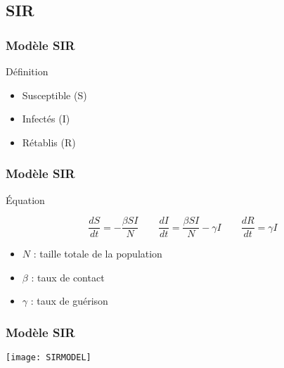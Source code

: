 \subsection{SIR}

\begin{frame}
        \frametitle{Modèle SIR}

        \begin{block}{Définition}
                \begin{itemize}
                        \item Susceptible (S) 
                        \item Infectés (I) 
                        \item Rétablis (R)
                \end{itemize}
        \end{block}
\end{frame}


\begin{frame}
        \frametitle{Modèle SIR}

        \begin{alertblock}{Équation}

                $$ \frac{dS}{dt} = -\frac{\beta SI}{N} \qquad \frac{dI}{dt} = \frac{\beta SI}{N} - \gamma I \qquad \frac{dR}{dt} = \gamma I $$

                \begin{itemize}
                        \item $N$ : taille totale de la population
                        \item $\beta$ : taux de contact
                        \item $\gamma$ : taux de guérison
                \end{itemize}

        \end{alertblock}
\end{frame}


\begin{frame}
        \frametitle{Modèle SIR}
        		\centering

		\texttt{[image: SIRMODEL]}
\end{frame}	
	 

